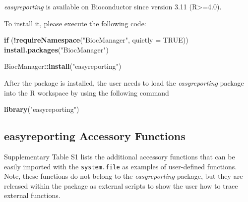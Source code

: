 \documentclass[]{article}
\newenvironment{Shaded}{\begin{snugshade}}{\end{snugshade}}
\newcommand{\ControlFlowTok}[1]{\textcolor[rgb]{0.13,0.29,0.53}{\textbf{#1}}}
\newcommand{\DataTypeTok}[1]{\textcolor[rgb]{0.13,0.29,0.53}{#1}}
\newcommand{\KeywordTok}[1]{\textcolor[rgb]{0.13,0.29,0.53}{\textbf{#1}}}
\newcommand{\NormalTok}[1]{#1}
\newcommand{\OperatorTok}[1]{\textcolor[rgb]{0.81,0.36,0.00}{\textbf{#1}}}
\newcommand{\OtherTok}[1]{\textcolor[rgb]{0.56,0.35,0.01}{#1}}
\newcommand{\StringTok}[1]{\textcolor[rgb]{0.31,0.60,0.02}{#1}}
\begin{document}
\emph{easyreporting} is available on Bioconductor since version 3.11
(R\textgreater{}=4.0).

To install it, please execute the following code:

\begin{Shaded}
\begin{Highlighting}[]
\ControlFlowTok{if}\NormalTok{ (}\OperatorTok{!}\KeywordTok{requireNamespace}\NormalTok{(}\StringTok{"BiocManager"}\NormalTok{, }\DataTypeTok{quietly =} \OtherTok{TRUE}\NormalTok{))}
    \KeywordTok{install.packages}\NormalTok{(}\StringTok{"BiocManager"}\NormalTok{)}

\NormalTok{BiocManager}\OperatorTok{::}\KeywordTok{install}\NormalTok{(}\StringTok{"easyreporting"}\NormalTok{)}
\end{Highlighting}
\end{Shaded}

After the package is installed, the user needs to load the
\emph{easyreporting} package into the R workspace by using the following
command

\begin{Shaded}
\begin{Highlighting}[]
\KeywordTok{library}\NormalTok{(}\StringTok{"easyreporting"}\NormalTok{) }
\end{Highlighting}
\end{Shaded}

%
        \setcounter{table}{0}
        \renewcommand{\thetable}{S\arabic{table}}%
        \setcounter{figure}{0}
        \renewcommand{\thefigure}{S\arabic{figure}}%

\hypertarget{easyreporting-accessory-functions}{%
\subsection{easyreporting Accessory
Functions}\label{easyreporting-accessory-functions}}

Supplementary Table S1 lists the additional accessory functions that can
be easily imported with the \texttt{system.file} as examples of
user-defined functions. Note, these functions do not belong to the
\emph{easyreporting} package, but they are released within the package
as external scripts to show the user how to trace external functions.
\end{document}
